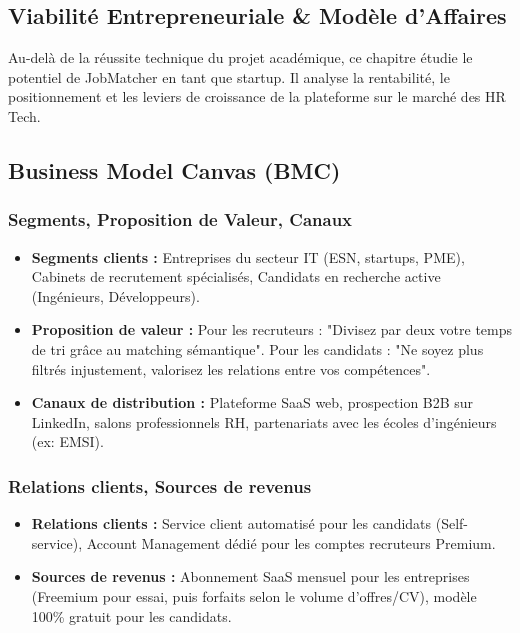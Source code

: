 \documentclass[12pt,a4paper]{report}
\begin{document}
\begin{itemize}
\chapter{Viabilité Entrepreneuriale \& Modèle d'Affaires}

Au-delà de la réussite technique du projet académique, ce chapitre étudie le potentiel de JobMatcher en tant que startup. Il analyse la rentabilité, le positionnement et les leviers de croissance de la plateforme sur le marché des HR Tech.

\section{Business Model Canvas (BMC)}

\subsection{Segments, Proposition de Valeur, Canaux}
\begin{itemize}
    \item \textbf{Segments clients :} Entreprises du secteur IT (ESN, startups, PME), Cabinets de recrutement spécialisés, Candidats en recherche active (Ingénieurs, Développeurs).
    \item \textbf{Proposition de valeur :} Pour les recruteurs : "Divisez par deux votre temps de tri grâce au matching sémantique". Pour les candidats : "Ne soyez plus filtrés injustement, valorisez les relations entre vos compétences".
    \item \textbf{Canaux de distribution :} Plateforme SaaS web, prospection B2B sur LinkedIn, salons professionnels RH, partenariats avec les écoles d'ingénieurs (ex: EMSI).
\end{itemize}

\subsection{Relations clients, Sources de revenus}
\begin{itemize}
    \item \textbf{Relations clients :} Service client automatisé pour les candidats (Self-service), Account Management dédié pour les comptes recruteurs Premium.
    \item \textbf{Sources de revenus :} Abonnement SaaS mensuel pour les entreprises (Freemium pour essai, puis forfaits selon le volume d'offres/CV), modèle 100\% gratuit pour les candidats.
\end{itemize}


\end{itemize}
\end{document}
